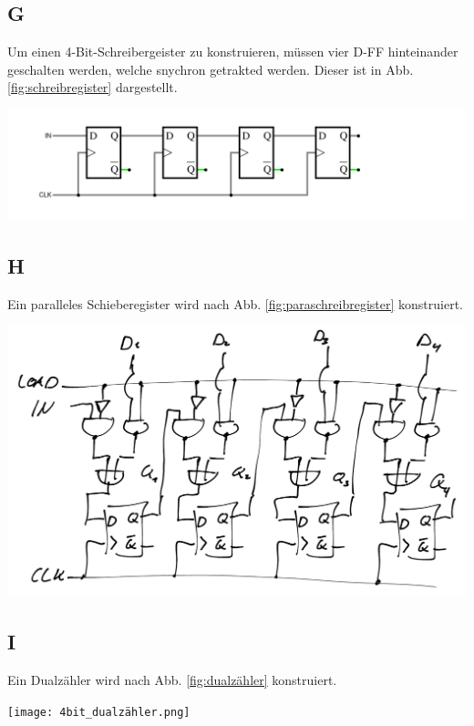 \documentclass[10pt]{article}
\newenvironment{Figure}
  {\par\medskip\noindent\minipage{\linewidth}}
  {\endminipage\par\medskip}
\begin{document}
\begin{multicols}{2}
	\subsection*{G}
	Um einen 4-Bit-Schreibergeister zu konstruieren, müssen vier D-FF hinteinander geschalten werden, welche snychron getrakted werden. Dieser ist in Abb. \ref{fig:schreibregister} dargestellt.
	\begin{Figure}
		\centering
		\includegraphics[width=1\textwidth]{circuit-20240908-2016.png}
		\label{fig:schreibregister}
	\end{Figure}
	\subsection*{H}
	Ein paralleles Schieberegister wird nach Abb. \ref{fig:paraschreibregister} konstruiert.
	\begin{Figure}
		\centering
		\includegraphics[width=1\textwidth]{parallel-schieberegister.png}
		\label{fig:paraschreibregister}
	\end{Figure}
	\subsection*{I}
	Ein Dualzähler wird nach Abb. \ref{fig:dualzähler} konstruiert.
	\begin{Figure}
		\centering
		\texttt{[image: 4bit\_dualzähler.png]}
		\label{fig:dualzähler}
	\end{Figure}

\end{multicols}
\end{document}
